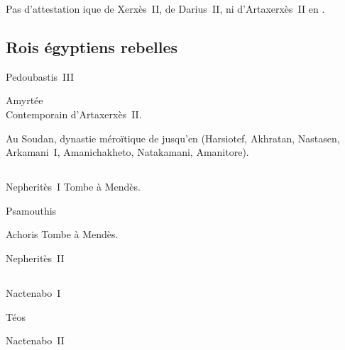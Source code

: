 Pas d'attestation {\hiero}ique de Xerxès~II, de Darius~II, ni 
d'Artaxerxès~II en \kmt.

\subsection{Rois égyptiens rebelles}

\begin{listerois}
  \item [Pedoubastis~III]
  \item [Amyrtée \datation{(\anorange{404}{398})}]  \\
        Contemporain d'Artaxerxès~II.
\end{listerois}

Au Soudan, dynastie méroïtique de  jusqu'en  
(Harsiotef, Akhratan, Nastasen, Arkamani~I\ier, Amanichakheto, 
Natakamani, Amanitore).

\subsection{\texorpdfstring{}{XXIXe dynastie}}

\begin{listerois}
  \item [Nepheritès~I\ier \datation{(\anorange{398}{392})}] 
        Tombe à Mendès.
  \item [Psamouthis]
  \item [Achoris \datation{(\anorange{391}{379})}] Tombe à Mendès.
  \item [Nepheritès~II]
\end{listerois}

\subsection{\texorpdfstring{}{XXXe dynastie}}


\begin{listerois}
  \item [Nactenabo~I\ier \datation{(\anorange{378}{360})}]
  \item [Téos \datation{(\anorange{361}{359})}]
  \item [Nactenabo~II \datation{(\anorange{359}{341})}]
\end{listerois}

